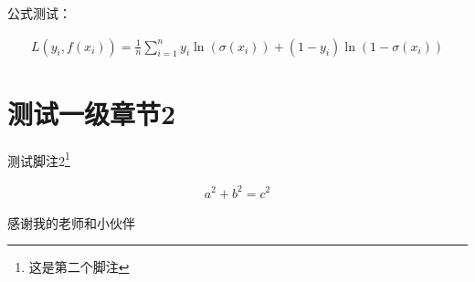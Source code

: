 \documentclass{SUIBEthesis}
\begin{document}
公式测试：

\begin{eqnarray}
L(y_i, f(x_i)) = \frac{1}{n}\sum_{i=1}^n y_i \ln (\sigma(x_i)) + (1-y_i)\ln (1-\sigma(x_i))
\end{eqnarray}



\section{测试一级章节2}
测试脚注2\footnote{这是第二个脚注}

\begin{eqnarray}
a^2 + b^2 = c^2
\end{eqnarray}

\newpage
\xiaosi



\newpage
\begin{mythanks}

感谢我的老师和小伙伴
\end{mythanks}
\end{document}
